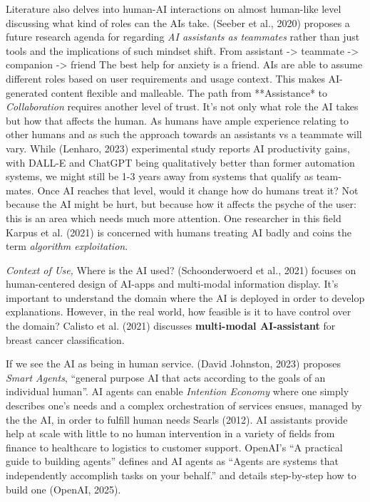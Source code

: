 \documentclass[
  12pt,
  letterpaper,
  DIV=11,
  numbers=noendperiod]{scrartcl}
\begin{document}
\let\pandoctableshortcapt\relax

Literature also delves into human-AI interactions on almost human-like
level discussing what kind of roles can the AIs take. (Seeber et al.,
2020) proposes a future research agenda for regarding \emph{AI
assistants as teammates} rather than just tools and the implications of
such mindset shift. From assistant -\textgreater{} teammate
-\textgreater{} companion -\textgreater{} friend The best help for
anxiety is a friend. AIs are able to assume different roles based on
user requirements and usage context. This makes AI-generated content
flexible and malleable. The path from **Assistance* to
\emph{Collaboration} requires another level of trust. It's not only what
role the AI takes but how that affects the human. As humans have ample
experience relating to other humans and as such the approach towards an
assistants vs a teammate will vary. While (Lenharo, 2023) experimental
study reports AI productivity gains, with DALL-E and ChatGPT being
qualitatively better than former automation systems, we might still be
1-3 years away from systems that qualify as team-mates. Once AI reaches
that level, would it change how do humans treat it? Not because the AI
might be hurt, but because how it affects the psyche of the user: this
is an area which needs much more attention. One researcher in this field
Karpus et al. (2021) is concerned with humans treating AI badly and
coins the term \emph{algorithm exploitation}.

\emph{Context of Use,} Where is the AI used? (Schoonderwoerd et al.,
2021) focuses on human-centered design of AI-apps and multi-modal
information display. It's important to understand the domain where the
AI is deployed in order to develop explanations. However, in the real
world, how feasible is it to have control over the domain? Calisto et
al. (2021) discusses \textbf{multi-modal AI-assistant} for breast cancer
classification.

If we see the AI as being in human service. (David Johnston, 2023)
proposes \emph{Smart Agents}, ``general purpose AI that acts according
to the goals of an individual human''. AI agents can enable
\emph{Intention Economy} where one simply describes one's needs and a
complex orchestration of services ensues, managed by the the AI, in
order to fulfill human needs Searls (2012). AI assistants provide help
at scale with little to no human intervention in a variety of fields
from finance to healthcare to logistics to customer support. OpenAI's
``A practical guide to building agents'' defines and AI agents as
``Agents are systems that independently accomplish tasks on your
behalf.'' and details step-by-step how to build one (OpenAI, 2025).
\end{document}
